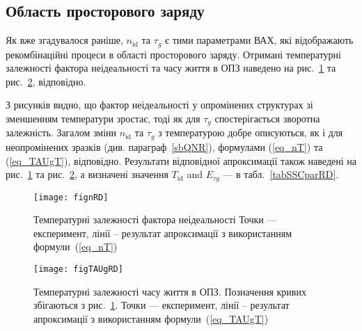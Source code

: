 \subsection{Область просторового заряду\label{sbSCR}}

Як вже згадувалося раніше, $n_{\mathrm{id}}$ та $\tau_{g}$ є тими параметрами ВАХ, які відображають рекомбінаційні процеси в
області просторового заряду.
Отримані температурні залежності фактора неідеальності та часу життя в ОПЗ наведено на рис.~\ref{fignRD} та рис.~\ref{figTAUgRD}, відповідно.



З рисунків видно, що фактор неідеальності у опромінених структурах зі зменшенням температури зростає,
тоді як для $\tau_{g}$ спостерігається зворотна залежність.
Загалом зміни $n_{\mathrm{id}}$ та $\tau_{g}$ з температурою добре описуються, як і для неопромінених зразків (див. параграф~\ref{sbQNR}),
 формулами (\ref{eq_nT}) та
(\ref{eq_TAUgT}), відповідно.
Результати відповідної апроксимації також наведені на рис.~\ref{fignRD} та рис.~\ref{figTAUgRD},
а визначені значення $T_{\mathrm{id}}$ and $E_{\tau g}$ --- в табл.~\ref{tabSSCparRD}.

\begin{figure}[b]
\center
\texttt{[image: fignRD]}%
\caption{\label{fignRD}
Температурні залежності фактора неідеальності
\FigCaptionSSCRD
Точки --- експеримент,
лінії -- результат апроксимації з використанням формули~(\ref{eq_nT})
}%
\end{figure}


\begin{figure}
\center
\texttt{[image: figTAUgRD]}%
\caption{\label{figTAUgRD}
Температурні залежності часу життя в ОПЗ.
Позначення кривих збігаються з рис.~\ref{fignRD}.
Точки --- експеримент,
лінії -- результат апроксимації з використанням формули~(\ref{eq_TAUgT})
}%
\end{figure}



